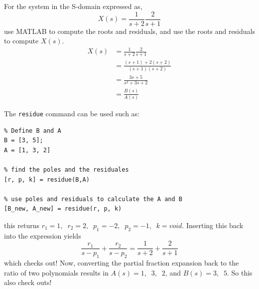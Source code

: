 \documentclass[12pt,letter]{article}
\begin{document}
\begin{example}

For the system in the S-domain expressed as,
\begin{equation}
X(s) = \frac{1}{s+2} \frac{2}{s+1}
\end{equation}
use MATLAB to compute the roots and residuals, and use the roots and residuals to compute $X(s)$.
\begin{align}
X(s) &= \frac{1}{s+2} \frac{2}{s+1} \\
& = \frac{(s+1)+2(s +2)}{(s+1)(s+2)} \nonumber \\
 &= \frac{3s+5}{s^2+3s+2}  \nonumber \\
&= \frac{B(s)}{A(s)} \nonumber 
\end{align}

\noindent The \texttt{residue} command can be used such as:

\lstset{linewidth=5.8in}
\begin{minipage}{1\textwidth}
  \begin{center}
    \lstset{%
caption=MATLAB code to find poles and resuduals.,
      basicstyle=\ttfamily\footnotesize\bfseries,
      frame=tb,
    }
\begin{lstlisting}
% Define B and A
B = [3, 5];
A = [1, 3, 2]

% find the poles and the residuales 
[r, p, k] = residue(B,A)

% use poles and residuals to calculate the A and B
[B_new, A_new] = residue(r, p, k)
\end{lstlisting}
  \end{center}
\end{minipage}
this returns $r_1 =1, \; \; r_2 =2, \; \; p_1 = -2, \; \; p_2 = -1, \; \; k=void$. Inserting this back into the expression yields 
\begin{equation}
\frac{r_1}{s-p_1} + \frac{r_2}{s-p_2} = \frac{1}{s+2} + \frac{2}{s+1}
\end{equation}
which checks out! Now, converting the partial fraction expansion back to the ratio of two polynomials results in $A(s) = 1,  \; \; 3,  \; \; 2$, and $B(s) = 3,  \; \; 5$. So this also check outs!
\end{example}
\end{document}

